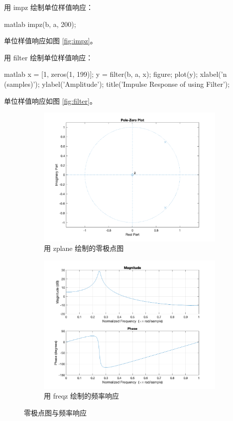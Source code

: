 \documentclass[a4paper]{article}  %
\begin{document}
用 impz 绘制单位样值响应：
\begin{codeblock}{matlab}
    impz(b, a, 200);
\end{codeblock}
单位样值响应如图 \ref{fig:impz}。

用 filter 绘制单位样值响应：
\begin{codeblock}{matlab}
    x = [1, zeros(1, 199)];
    y = filter(b, a, x);
    figure;
    plot(y);
    xlabel('n (samples)');
    ylabel('Amplitude');
    title('Impulse Response of using Filter');
\end{codeblock}
单位样值响应如图 \ref{fig:filter}。

\begin{figure}[ht]
    \centering
    \begin{subfigure}[b]{0.48\textwidth}
        \centering
        \includegraphics[width=\textwidth]{asserts/1_1_zplane.png}
        \caption{
            用 zplane 绘制的零极点图
        }\label{fig:zplane}
    \end{subfigure}
    \hfill
    \begin{subfigure}[b]{0.48\textwidth}
        \centering
        \includegraphics[width=\textwidth]{asserts/1_1_freqz.png}
        \caption{
            用 freqz 绘制的频率响应
        }\label{fig:freqz}
    \end{subfigure}
    \caption{
        零极点图与频率响应
    }
\end{figure}
\end{document}
